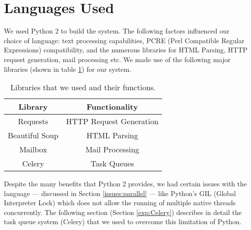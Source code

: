 \section{Languages Used}

We used Python 2 to build the system. The following factors influenced our choice of language: text processing capabilities, PCRE (Perl Compatible Regular Expressions) compatibility, and the numerous libraries for HTML Parsing, HTTP request generation, mail processing etc.
We made use of the following major libraries (shown in table \ref{tab:libs}) for our system.

\begin{table}[!htbp]
	\centering
	\begin{tabular}{|c|c|}
		\hline
		\multicolumn{1}{|c|}{\textbf{Library}} &
		\multicolumn{1}{c|}{\textbf{Functionality}} \\
		\hline
		Requests & HTTP Request Generation\\
		\hline
		Beautiful Soup & HTML Parsing\\
		\hline
		Mailbox & Mail Processing\\
		\hline
		Celery & Task Queues\\
		\hline
	\end{tabular}
	\caption[Python libraries]{Libraries that we used and their functions.}
	\label{tab:libs}
\end{table}

Despite the many benefits that Python 2 provides, we had certain issues with the language --- discussed in Section \ref{issues:parallel} --- like Python's GIL (Global Interpreter Lock) which does not allow the running of multiple native threads concurrently.
The following section (Section \ref{exp:Celery}) describes in detail the task queue system (Celery) that we used to overcome this limitation of Python.
